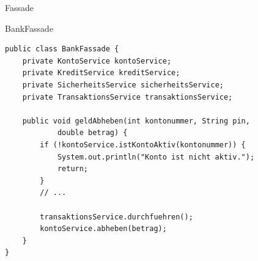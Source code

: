 \begin{frame}[fragile]{Fassade}
	\begin{exampleblock}{BankFassade}
 		\begin{lstlisting}
public class BankFassade {
    private KontoService kontoService;
    private KreditService kreditService;
    private SicherheitsService sicherheitsService;
    private TransaktionsService transaktionsService;
    
    public void geldAbheben(int kontonummer, String pin, 
            double betrag) {
        if (!kontoService.istKontoAktiv(kontonummer)) {
            System.out.println("Konto ist nicht aktiv.");
            return;
        }
        // ...
        
        transaktionsService.durchfuehren();
        kontoService.abheben(betrag);
    }
}    
 		\end{lstlisting}
 	\end{exampleblock}
\end{frame}



